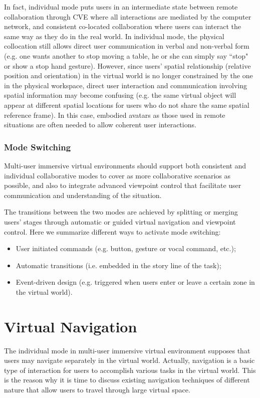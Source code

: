 In fact, individual mode puts users in an intermediate state between remote collaboration through CVE where all interactions are mediated by the computer network, and consistent co-located collaboration where users can interact the same way as they do in the real world. In individual mode, the physical collocation still allows direct user communication in verbal and non-verbal form (e.g. one wants another to stop moving a table, he or she can simply say ``stop" or show a stop hand gesture). However, since users' spatial relationship (relative position and orientation) in the virtual world is no longer constrained by the one in the physical workspace, direct user interaction and communication involving spatial information may become confusing (e.g. the same virtual object will appear at different spatial locations for users who do not share the same spatial reference frame). In this case, embodied avatars as those used in remote situations are often needed to allow coherent user interactions.

\subsubsection{Mode Switching}
Multi-user immersive virtual environments should support both consistent and individual collaborative modes to cover as more collaborative scenarios as possible, and also to integrate advanced viewpoint control that facilitate user communication and understanding of the situation.

The transitions between the two modes are achieved by splitting or merging users' stages through automatic or guided virtual navigation and viewpoint control. Here we summarize different ways to activate mode switching:

\begin{itemize}
\item User initiated commands (e.g. button, gesture or vocal command, etc.);
\item Automatic transitions (i.e. embedded in the story line of the task);
\item Event-driven design (e.g. triggered when users enter or leave a certain zone in the virtual world).
\end{itemize}



\section{Virtual Navigation}
\label{sec:navigation}
The individual mode in multi-user immersive virtual environment supposes that users may navigate separately in the virtual world. Actually, navigation is a basic type of interaction for users to accomplish various tasks in the virtual world. This is the reason why it is time to discuss existing navigation techniques of different nature that allow users to travel through large virtual space.

